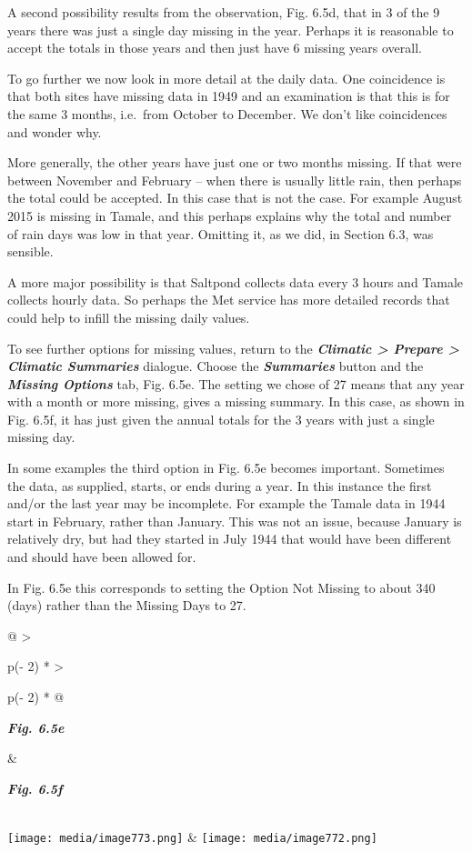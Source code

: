 \documentclass[
  letterpaper,
  DIV=11,
  numbers=noendperiod]{scrreprt}
\begin{document}
A second possibility results from the observation, Fig. 6.5d, that in 3
of the 9 years there was just a single day missing in the year. Perhaps
it is reasonable to accept the totals in those years and then just have
6 missing years overall.

To go further we now look in more detail at the daily data. One
coincidence is that both sites have missing data in 1949 and an
examination is that this is for the same 3 months, i.e.~from October to
December. We don't like coincidences and wonder why.

More generally, the other years have just one or two months missing. If
that were between November and February -- when there is usually little
rain, then perhaps the total could be accepted. In this case that is not
the case. For example August 2015 is missing in Tamale, and this perhaps
explains why the total and number of rain days was low in that year.
Omitting it, as we did, in Section 6.3, was sensible.

A more major possibility is that Saltpond collects data every 3 hours
and Tamale collects hourly data. So perhaps the Met service has more
detailed records that could help to infill the missing daily values.

To see further options for missing values, return to the
\textbf{\emph{Climatic \textgreater{} Prepare \textgreater{} Climatic
Summaries}} dialogue. Choose the \textbf{\emph{Summaries}} button and
the \textbf{\emph{Missing Options}} tab, Fig. 6.5e. The setting we chose
of 27 means that any year with a month or more missing, gives a missing
summary. In this case, as shown in Fig. 6.5f, it has just given the
annual totals for the 3 years with just a single missing day.

In some examples the third option in Fig. 6.5e becomes important.
Sometimes the data, as supplied, starts, or ends during a year. In this
instance the first and/or the last year may be incomplete. For example
the Tamale data in 1944 start in February, rather than January. This was
not an issue, because January is relatively dry, but had they started in
July 1944 that would have been different and should have been allowed
for.

In Fig. 6.5e this corresponds to setting the Option Not Missing to about
340 (days) rather than the Missing Days to 27.

\begin{longtable}[]{@{}
  >{\raggedright\arraybackslash}p{(\columnwidth - 2\tabcolsep) * }
  >{\raggedright\arraybackslash}p{(\columnwidth - 2\tabcolsep) * }@{}}
\toprule\noalign{}
\begin{minipage}[b]{\linewidth}\raggedright
\textbf{\emph{Fig. 6.5e}}
\end{minipage} & \begin{minipage}[b]{\linewidth}\raggedright
\textbf{\emph{Fig. 6.5f}}
\end{minipage} \\
\midrule\noalign{}
\endhead
\bottomrule\noalign{}
\endlastfoot
\texttt{[image: media/image773.png]} &
\texttt{[image: media/image772.png]} \\
\end{longtable}
\end{document}
